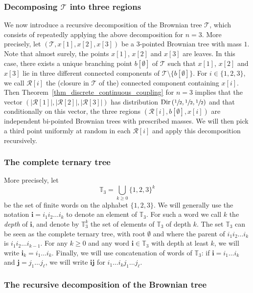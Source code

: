 \documentclass[JEP,XML,SOM,Unicode,NoFloatCountersInSection,published]{cedram}
\let\backslash\setminus
\newcommand{\Tt}{\mathcal{T}}
\newcommand{\Rr}{\mathcal{R}}
\newcommand{\ii}{\mathbf{i}}
\newcommand{\jj}{\mathbf{j}}
\newcommand{\Dir}{\mathrm{Dir}}
\theoremstyle{plain}
\theoremstyle{definition}
\begin{document}
\subsubsection*{Decomposing $\Tt$ into three regions}
We now introduce a recursive decomposition of the Brownian tree $\Tt$, which consists of repeatedly applying the above decomposition for $n=3$.
More precisely, let $\left( \Tt, x[1], x[2], x[3] \right)$ be a $3$-pointed Brownian tree with mass $1$.
Note that almost surely, the points $x[1]$, $x[2]$ and $x[3]$ are leaves.
In this case, there exists a unique branching point $b[\emptyset]$ of $\Tt$ such that $x[1]$, $x[2]$ and $x[3]$ lie in three different connected components of $\Tt \backslash \{b[\emptyset]\}$.
For $i \in \{1,2,3\}$, we call $\Rr[i]$ the (closure in $\Tt$ of the) connected component containing $x[i]$.
Then Theorem~\ref{thm_discrete_continuous_coupling} for $n=3$ implies that the vector $\left( \left| \Rr[1] \right|, \left| \Rr[2] \right|, \left| \Rr[3] \right| \right)$ has distribution $\Dir \left( \sfrac{1}{2}, \sfrac{1}{2}, \sfrac{1}{2} \right)$ and that conditionally on this vector, the three regions $\left( \Rr[i], b[\emptyset], x[i] \right)$ are independent bi-pointed Brownian trees with prescribed masses.
We will then pick a third point uniformly at random in each $\Rr[i]$ and apply this decomposition recursively.

\subsubsection*{The complete ternary tree}
More precisely, let\vspace*{-3pt}\enlargethispage{.5\baselineskip}
\[ \mathbb{T}_3=\bigcup_{k \geq 0} \{1,2,3\}^k\]
be the set of finite words on the alphabet $\{1,2,3\}$.
We will generally use the notation $\ii=i_1 i_2 \dots i_k$ to denote an element of $\mathbb{T}_3$.
For such a word we call $k$ the \emph{depth} of $\ii$, and denote by $\mathbb{T}_3^k$ the set of elements of $ \mathbb{T}_3$ of depth $k$.
The set $\mathbb{T}_3$ can be seen as the complete ternary tree, with root $\emptyset$ and where the parent of $i_1 i_2 \dots i_k$ is $i_1 i_2 \dots i_{k-1}$.
For any $k \geq 0$ and any word $\ii \in \mathbb{T}_3$ with depth at least $k$, we will write $\ii_k=i_1 \dots i_k$.
Finally, we will use concatenation of words of $\mathbb{T}_3$: if $\ii=i_1 \dots i_k$ and $\jj=j_1 \dots j_{\ell}$, we will write $\ii\jj$ for $i_1 \dots i_k j_1 \dots j_{\ell}$.

\subsubsection*{The recursive decomposition of the Brownian tree}
\end{document}
